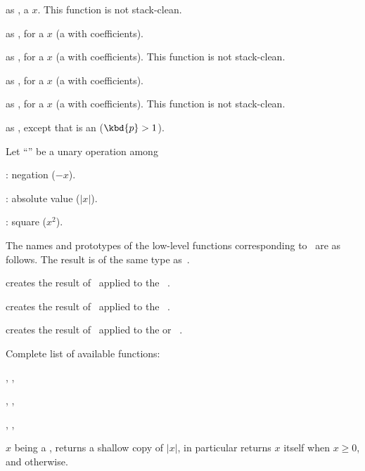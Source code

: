  as ,
a  $x$.
This function is not stack-clean.

 as , for
a  $x$ (a  with  coefficients).

 as , for
a  $x$ (a  with  coefficients).
This function is not stack-clean.

 as , for
a  $x$ (a  with  coefficients).

 as , for
a  $x$ (a  with  coefficients).
This function is not stack-clean.

 as ,
except that  is an  ($\kbd{p} > 1$).

 Let ``\op'' be a unary operation among

\item {}: negation ($-x$).

\item {}: absolute value ($|x|$).

\item {}: square ($x^2$).

\noindent The names and prototypes of the low-level functions corresponding
to \op\ are as follows. The result is of the same type as~.

 creates the result of \op\ applied to the
~.

 creates the result of \op\ applied to the
~.

 creates the result of \op\ applied to the
 or ~.

\noindent Complete list of available functions:

, , 

, , 

, , 

 $x$ being a , returns a shallow copy of
$|x|$, in particular returns $x$ itself when $x \geq 0$, and 
otherwise.

